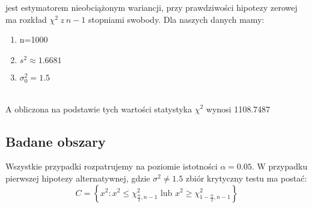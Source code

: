 \documentclass[12pt,letterpaper]{article}
\theoremstyle{definition}
\begin{document}
jest estymatorem nieobciążonym wariancji, przy prawdziwości hipotezy zerowej ma rozkład $\chi^2 \ z \  n - 1$ stopniami swobody. Dla naszych danych mamy:\\
\begin{enumerate}
    \item n=1000
    \item $s^2 \approx 1.6681$
    \item $\sigma^2_0 = 1.5$
\end{enumerate}
\\
A obliczona na podstawie tych wartości statystyka $\chi^2$ wynosi 1108.7487

\subsection{Badane obszary}
Wszystkie przypadki rozpatrujemy na poziomie istotności $\alpha = 0.05$. W przypadku pierwszej hipotezy alternatywnej, gdzie $\sigma ^2 \neq 1.5$ zbiór krytyczny testu ma postać:
\[
C = \left\{x^2 : x^2 \leq \chi^2_{\frac{\alpha}{2}, n-1} \text{ lub } x^2 \geq \chi^2_{1 - \frac{\alpha}{2}, n-1}\right\}
\]
\end{document}
